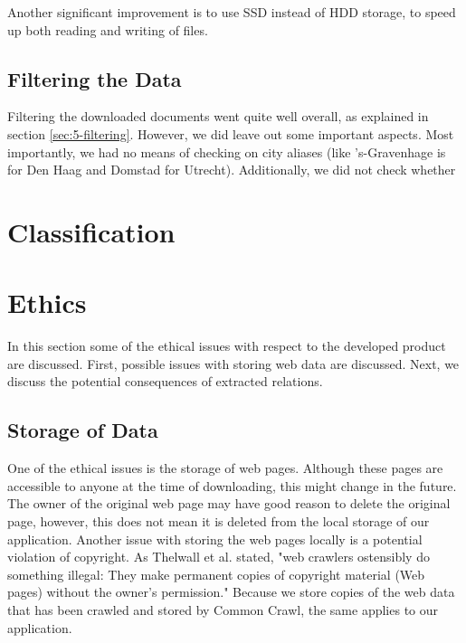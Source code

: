 Another significant improvement is to use SSD instead of HDD storage, to speed up both reading and writing of files.

\subsection{Filtering the Data}
Filtering the downloaded documents went quite well overall, as explained in section \ref{sec:5-filtering}. However, we did leave out some important aspects. Most importantly, we had no means of checking on city aliases (like 's-Gravenhage is for Den Haag and Domstad for Utrecht). Additionally, we did not check whether 


\section{Classification} \label{sec:discuss-classifier}

\section{Ethics}
In this section some of the ethical issues with respect to the developed product are discussed. First, possible issues with storing web data are discussed. Next, we discuss the potential consequences of extracted relations.

\subsection{Storage of Data}
One of the ethical issues is the storage of web pages. Although these pages are accessible to anyone at the time of downloading, this might change in the future. The owner of the original web page may have good reason to delete the original page, however, this does not mean it is deleted from the local storage of our application. Another issue with storing the web pages locally is a potential violation of copyright. As Thelwall et al. stated, "web crawlers ostensibly do something illegal: They make permanent copies of copyright material (Web pages) without the owner’s permission."\cite{thelwall2006web} Because we store copies of the web data that has been crawled and stored by Common Crawl, the same applies to our application.

